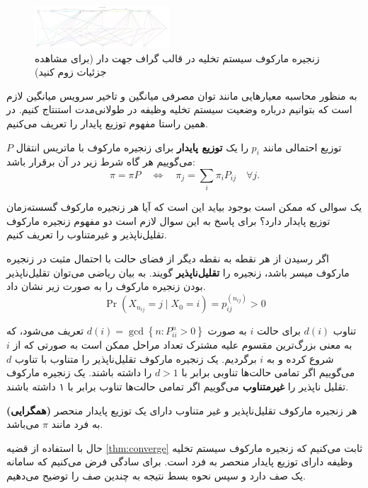 \newpage
\begin{figure}[H]
\centering
\includegraphics[angle=270, origin=c, width=0.45\textwidth]{figures/graph.pdf}
\caption[زنجیره مارکوف سیستم تخلیه در قالب گراف جهت دار]{
زنجیره مارکوف سیستم تخلیه در قالب گراف جهت دار (برای مشاهده جزئیات زوم کنید)
}
\label{fig:digraph}
\end{figure}
\newpage
به منظور محاسبه معیارهایی مانند توان مصرفی میانگین و تاخیر سرویس میانگین لازم است که بتوانیم درباره وضعیت سیستم تخلیه وظیفه در طولانی‌مدت استنتاج کنیم. در همین راستا مفهوم توزیع پایدار را تعریف می‌کنیم.
\begin{defi}
توزیع احتمالی مانند $p_i$ را یک \textbf{توزیع پایدار} برای زنجیره مارکوف با ماتریس انتقال \(P\) می‌گوییم هر گاه شرط زیر در آن برقرار باشد:
\begin{equation*}
	\pi=\pi P \quad \Longleftrightarrow \quad \pi_{j}=\sum_{i} \pi_{i} P_{i j} \quad \forall j .
\end{equation*}
\end{defi}
یک سوالی که ممکن است بوجود بیاید این است که آیا هر زنجیره مارکوف گسسته‌زمان توزیع پایدار دارد؟ برای پاسخ به این سوال لازم است دو مفهوم زنجیره مارکوف تقلیل‌ناپذیر و غیرمتناوب را تعریف کنیم.
\begin{defi}
اگر رسیدن از هر نقطه به نقطه دیگر از فضای حالت با احتمال مثبت در زنجیره مارکوف میسر باشد، زنجیره را \textbf{تقلیل‌ناپذیر} گویند. به بیان ریاضی می‌توان تقلیل‌ناپذیر بودن زنجیره مارکوف را به صورت زیر نشان داد.
\begin{equation*}
	\operatorname{Pr}\left(X_{n_{i j}}=j \mid X_{0}=i\right)=p_{i j}^{\left(n_{i j}\right)}>0
\end{equation*}
\end{defi}

\begin{defi}
تناوب $d(i)$ برای حالت $i$ به صورت $d(i)=\operatorname{gcd}\left\{n: P_{i i}^{n}>0\right\}$ تعریف می‌شود، که به معنی بزرگ‌ترین مقسوم علیه مشترک تعداد مراحل ممکن است به صورتی که از $i$ شروع کرده و به $i$ برگردیم. یک زنجیره مارکوف تقلیل‌ناپذیر را متناوب با تناوب $d$ می‌گوییم اگر تمامی حالت‌ها تناوبی برابر با $d > 1$ را داشته باشند. یک زنجیره مارکوف تقلیل ناپذیر را \textbf{غیرمتناوب} می‌گوییم اگر تمامی حالت‌ها تناوب برابر با ۱ داشته باشند.
\end{defi}
\begin{thm}
\label{thm:converge}
\textbf{(همگرایی)}
هر زنجیره مارکوف تقلیل‌ناپذیر و غیر متناوب دارای یک توزیع پایدار منحصر به فرد مانند $\pi$ می‌باشد.
\end{thm}
حال با استفاده از قضیه \ref{thm:converge} ثابت می‌کنیم که زنجیره مارکوف سیستم تخلیه وظیفه دارای توزیع پایدار منحصر به فرد است. برای سادگی فرض می‌کنیم که سامانه یک صف دارد و سپس نحوه بسط نتیجه به چندین صف را توضیح می‌دهیم.


